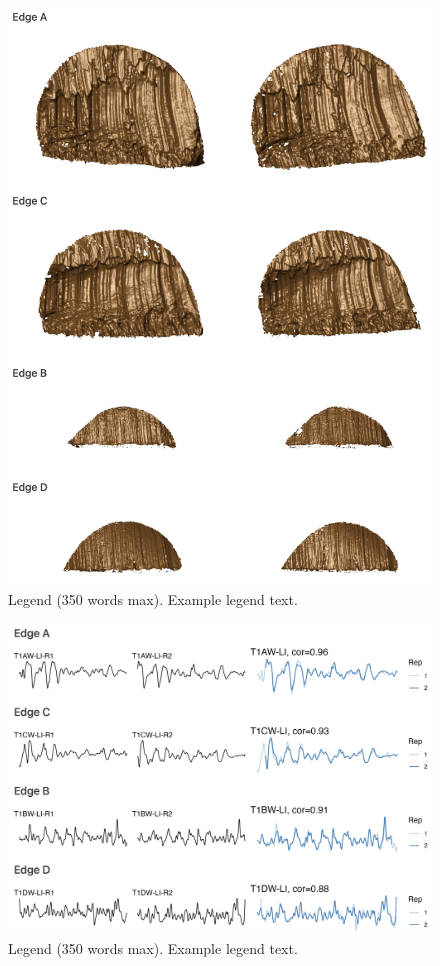 \documentclass[fleqn,10pt]{wlscirep}
\begin{document}
\begin{figure}[ht]
\centering
\includegraphics[width=0.8\linewidth]{scans_pair.png}
\caption{Legend (350 words max). Example legend text.}
\label{fig: scans_pair}
\end{figure}

\begin{figure}[ht]
\centering
\includegraphics[width=0.8\linewidth]{signals_pair_alignment.png}
\caption{Legend (350 words max). Example legend text.}
\label{fig: signals_pair_alignment}
\end{figure}
\end{document}
